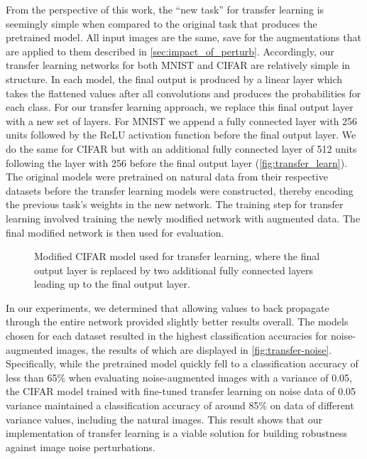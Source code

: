 \documentclass[conference]{IEEEtran}
\begin{document}
From the perspective of this work, the “new task” for transfer learning is seemingly simple when compared to the original task that produces the pretrained model. All input images are the same, save for the augmentations that are applied to them described in \autoref{sec:impact_of_perturb}. Accordingly, our transfer learning networks for both MNIST and CIFAR are relatively simple in structure. In each model, the final output is produced by a linear layer which takes the flattened values after all convolutions and produces the probabilities for each class. For our transfer learning approach, we replace this final output layer with a new set of layers. For MNIST we append a fully connected layer with 256 units followed by the ReLU activation function before the final output layer. We do the same for CIFAR but with an additional fully connected layer of 512 units following the layer with 256 before the final output layer (\autoref{fig:transfer_learn}). The original models were pretrained on natural data from their respective datasets before the transfer learning models were constructed, thereby encoding the previous task’s weights in the new network. The training step for transfer learning involved training the newly modified network with augmented data. The final modified network is then used for evaluation.

\begin{figure}[H]
	\centering
	
	\captionsetup{width=0.90\linewidth}
	\caption{Modified CIFAR model used for transfer learning, where the final output layer is replaced by two additional fully connected layers leading up to the final output layer.}
	\label{fig:transfer_learn}
\end{figure}

In our experiments, we determined that allowing values to back propagate through the entire network provided slightly better results overall. The models chosen for each dataset resulted in the highest classification accuracies for noise-augmented images, the results of which are displayed in \autoref{fig:transfer-noise}. Specifically, while the pretrained model quickly fell to a classification accuracy of less than 65\% when evaluating noise-augmented images with a variance of 0.05, the CIFAR model trained with fine-tuned transfer learning on noise data of 0.05 variance maintained a classification accuracy of around 85\% on data of different variance values, including the natural images. This result shows that our implementation of transfer learning is a viable solution for building robustness against image noise perturbations.
\end{document}

